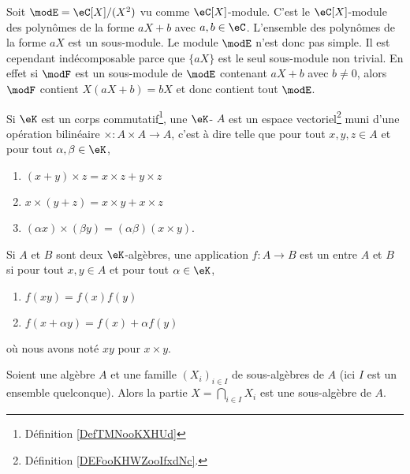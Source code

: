 \begin{example}
    Soit \( \modE=\eC[X]/(X^2)\) vu comme \( \eC[X]\)-module. C'est le \( \eC[X]\)-module des polynômes de la forme \( aX+b\) avec \( a,b\in \eC\). L'ensemble des polynômes de la forme \( aX\) est un sous-module. Le module \( \modE\) n'est donc pas simple. Il est cependant indécomposable parce que \( \{ aX \}\) est le seul sous-module non trivial. En effet si \( \modF\) est un sous-module de \( \modE\) contenant \( aX+b\) avec \( b\neq 0\), alors \( \modF\) contient \( X(aX+b)=bX\) et donc contient tout \( \modE\).
\end{example}

\begin{definition}   \label{DefAEbnJqI}
    Si \( \eK\) est un corps commutatif\footnote{Définition \ref{DefTMNooKXHUd}}, une \( \eK\)- \( A\) est un espace vectoriel\footnote{Définition \ref{DEFooKHWZooIfxdNc}.} muni d'une opération bilinéaire \( \times\colon A\times A\to A\), c'est à dire telle que pour tout \( x,y,z\in A\) et pour tout \( \alpha,\beta\in\eK\),
    \begin{enumerate}
        \item
            \( (x+y)\times z=x\times z+y\times z\)
        \item
            \( x\times (y+z)=x\times y+x\times z\)
        \item
            \( (\alpha x)\times (\beta y)=(\alpha\beta)(x\times y)\).
    \end{enumerate}
    Si \( A\) et \( B\) sont deux \( \eK\)-algèbres, une application \( f\colon A\to B\) est un  entre \( A\) et \( B\) si pour tout \( x,y\in A\) et pour tout \( \alpha\in \eK\),
    \begin{enumerate}
        \item
            \( f(xy)=f(x)f(y)\)
        \item
            \( f(x+\alpha y)=f(x)+\alpha f(y)\)
    \end{enumerate}
    où nous avons noté \( xy\) pour \( x\times y\).
\end{definition}

\begin{lemma}   \label{LEMooVKLKooSAHmpZ}
    Soient une algèbre \( A\) et une famille \( (X_i)_{i\in I}\) de sous-algèbres de \( A\) (ici \( I\) est un ensemble quelconque). Alors la partie \( X=\bigcap_{i\in I}X_i\) est une sous-algèbre de \( A\).
\end{lemma}

